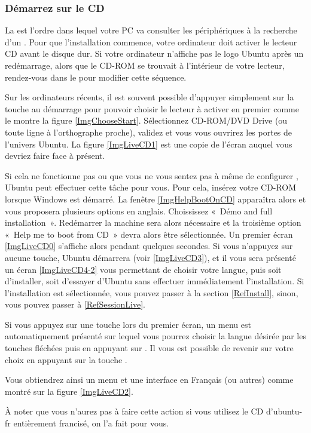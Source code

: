 \subsubsection{Démarrez sur le CD}
La  est l'ordre dans lequel votre PC va consulter les périphériques à la recherche d'un . Pour que l'installation commence, votre ordinateur doit activer le lecteur CD avant le disque dur. Si votre ordinateur n'affiche pas le logo Ubuntu après un redémarrage, alors que le CD-ROM se trouvait à l'intérieur de votre lecteur, rendez-vous dans le   pour modifier cette séquence.\par
{}
Sur les ordinateurs récents, il est souvent possible d'appuyer simplement sur la touche  au démarrage pour pouvoir choisir le lecteur à activer en premier comme le montre la figure \ref{ImgChooseStart}. Sélectionnez CD-ROM/DVD Drive (ou toute ligne à l'orthographe proche), validez et vous vous ouvrirez les portes de l'univers Ubuntu. La figure \ref{ImgLiveCD1} est une copie de l'écran auquel vous devriez faire face à présent.\par
Si cela ne fonctionne pas ou que vous ne vous sentez pas à même de configurer , Ubuntu peut effectuer cette tâche pour vous. Pour cela, insérez votre CD-ROM lorsque Windows est démarré. La fenêtre \ref{ImgHelpBootOnCD} apparaîtra alors et vous proposera plusieurs options en anglais. Choississez «~Démo and full installation~». Redémarrer la machine sera alors nécessaire et la troisième option «~Help me to boot from CD~» devra alors être sélectionnée.
Un premier écran \ref{ImgLiveCD0} s'affiche alors pendant quelques secondes. Si vous n'appuyez sur aucune touche, Ubuntu démarrera (voir \ref{ImgLiveCD3}), et il vous sera présenté un écran \ref{ImgLiveCD4-2} vous permettant de choisir votre langue, puis soit d'installer, soit d'essayer d'Ubuntu sans effectuer immédiatement l'installation. Si l'installation est sélectionnée, vous pouvez passer à la section \ref{RefInstall}, sinon, vous pouvez passer à \ref{RefSessionLive}.\par
\ChoixDebutLive
Si vous appuyez sur une touche lors du premier écran, un menu est automatiquement présenté sur lequel vous pourrez choisir la langue désirée par les touches fléchées puis en appuyant sur . Il vous est possible de revenir sur votre choix en appuyant sur la touche .\par
Vous obtiendrez ainsi un menu et une interface en Français (ou autres) comme montré sur la figure \ref{ImgLiveCD2}.\par
À noter que vous n'aurez pas à faire cette action si vous utilisez le CD d'ubuntu-fr entièrement francisé, on l'a fait pour vous.
\ChoixDebutInstall
